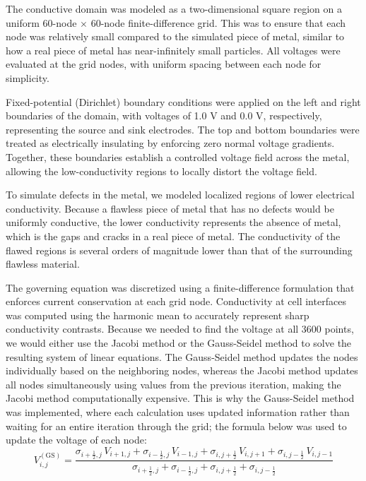 \documentclass[reprint,amsmath,amssymb,aps]{revtex4-2}
\begin{document}
The conductive domain was modeled as a two-dimensional square region on a uniform 60-node $\times$ 60-node finite-difference grid. This was to ensure that each node was relatively small compared to the simulated piece of metal, similar to how a real piece of metal has near-infinitely small particles. All voltages were evaluated at the grid nodes, with uniform spacing between each node for simplicity.

Fixed-potential (Dirichlet) boundary conditions were applied on the left and right boundaries of the domain, with voltages of 1.0 V and 0.0 V, respectively, representing the source and sink electrodes. The top and bottom boundaries were treated as electrically insulating by enforcing zero normal voltage gradients. Together, these boundaries establish a controlled voltage field across the metal, allowing the low-conductivity regions to locally distort the voltage field.

To simulate defects in the metal, we modeled localized regions of lower electrical conductivity. Because a flawless piece of metal that has no defects would be uniformly conductive, the lower conductivity represents the absence of metal, which is the gaps and cracks in a real piece of metal. The conductivity of the flawed regions is several orders of magnitude lower than that of the surrounding flawless material. 

The governing equation was discretized using a finite-difference formulation that enforces current conservation at each grid node. Conductivity at cell interfaces was computed using the harmonic mean to accurately represent sharp conductivity contrasts. Because we needed to find the voltage at all 3600 points, we would either use the Jacobi method or the Gauss-Seidel method to solve the resulting system of linear equations. The Gauss-Seidel method updates the nodes individually based on the neighboring nodes, whereas the Jacobi method updates all nodes simultaneously using values from the previous iteration, making the Jacobi method computationally expensive. This is why the Gauss-Seidel method was implemented, where each calculation uses updated information rather than waiting for an entire iteration through the grid; the formula below was used to update the voltage of each node:
\vspace{1em}
\begin{equation} 
V_{i,j}^{(\mathrm{GS})} = \frac{\sigma_{i+\frac{1}{2},j} \, V_{i+1,j} + \sigma_{i-\frac{1}{2},j} \, V_{i-1,j} + \sigma_{i,j+\frac{1}{2}} \, V_{i,j+1} + \sigma_{i,j-\frac{1}{2}} \, V_{i,j-1}}{\sigma_{i+\frac{1}{2},j} + \sigma_{i-\frac{1}{2},j} + \sigma_{i,j+\frac{1}{2}} + \sigma_{i,j-\frac{1}{2}}}
\end{equation}
\label{Gauss-Seidel update formula}
\vspace{0.5em}
\end{document}
